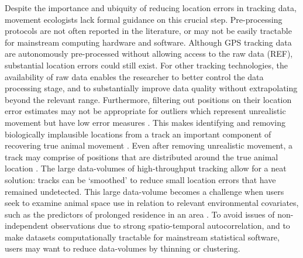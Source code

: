 \documentclass[10pt,paper=a4,headings=standardclasses
]{scrartcl}
\begin{document}
Despite the importance and ubiquity of reducing location errors in tracking data, movement ecologists lack formal guidance on this crucial step.
Pre-processing protocols are not often reported in the literature, or may not be easily tractable for mainstream computing hardware and software. Although GPS tracking data are autonomously pre-processed without allowing access to the raw data (REF), substantial location errors could still exist. For other tracking technologies, the availability of raw data enables the researcher to better control the data processing stage, and to substantially improve data quality without extrapolating beyond the relevant range.     
Furthermore, filtering out positions on their location error estimates may not be appropriate for outliers which represent unrealistic movement but have low error measures \citep{weiser2016, ranacher2016}.
This makes identifying and removing biologically implausible locations from a track an important component of recovering true animal movement \citep{bjorneraas2010}.
Even after removing unrealistic movement, a track may comprise of positions that are distributed around the true animal location \citep{noonan2019}.
The large data-volumes of high-throughput tracking allow for a neat solution: tracks can be `smoothed' to reduce small location errors that have remained undetected.
This large data-volume becomes a challenge when users seek to examine animal space use in relation to relevant environmental covariates, such as the predictors of prolonged residence in an area \citep[see][]{bracis2018, aarts2008, fleming2014a,bijleveld2016, oudman2018, harel2016}.
To avoid issues of non-independent observations due to strong spatio-temporal autocorrelation, and to make datasets computationally tractable for mainstream statistical software, users may want to reduce data-volumes by thinning or clustering.
\end{document}
